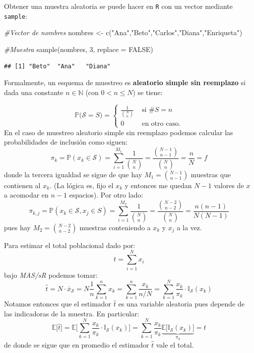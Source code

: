 \documentclass[
]{book}
\newenvironment{Shaded}{\begin{snugshade}}{\end{snugshade}}
\newcommand{\AttributeTok}[1]{\textcolor[rgb]{0.77,0.63,0.00}{#1}}
\newcommand{\CommentTok}[1]{\textcolor[rgb]{0.56,0.35,0.01}{\textit{#1}}}
\newcommand{\ConstantTok}[1]{\textcolor[rgb]{0.00,0.00,0.00}{#1}}
\newcommand{\DecValTok}[1]{\textcolor[rgb]{0.00,0.00,0.81}{#1}}
\newcommand{\FunctionTok}[1]{\textcolor[rgb]{0.00,0.00,0.00}{#1}}
\newcommand{\NormalTok}[1]{#1}
\newcommand{\OtherTok}[1]{\textcolor[rgb]{0.56,0.35,0.01}{#1}}
\newcommand{\StringTok}[1]{\textcolor[rgb]{0.31,0.60,0.02}{#1}}
\begin{document}
Obtener una muestra aleatoria se puede hacer en \texttt{R} con un vector mediante \texttt{sample}:

\begin{Shaded}
\begin{Highlighting}[]
\CommentTok{\#Vector de nombres}
\NormalTok{nombres }\OtherTok{\textless{}{-}} \FunctionTok{c}\NormalTok{(}\StringTok{"Ana"}\NormalTok{,}\StringTok{"Beto"}\NormalTok{,}\StringTok{"Carlos"}\NormalTok{,}\StringTok{"Diana"}\NormalTok{,}\StringTok{"Enriqueta"}\NormalTok{)}

\CommentTok{\#Muestra}
\FunctionTok{sample}\NormalTok{(nombres, }\DecValTok{3}\NormalTok{, }\AttributeTok{replace =} \ConstantTok{FALSE}\NormalTok{)}
\end{Highlighting}
\end{Shaded}

\begin{verbatim}
## [1] "Beto"  "Ana"   "Diana"
\end{verbatim}

Formalmente, un esquema de muestreo es \textbf{aleatorio simple sin reemplazo} si dada una constante \(n \in \mathbb{N}\) (con \(0 < n \leq N\)) se tiene:

\[
\mathbb{P}\big( \mathcal{S} = S \big) = \begin{cases}
\frac{1}{\binom{N}{n}} & \text{ si } \#S = n \\
0 & \text{ en otro caso.}
\end{cases}
\]
En el caso de muestreo aleatorio simple sin reemplazo podemos calcular las probabilidades de inclusión como siguen:
\[
\pi_k = \mathbb{P}(x_k \in \mathcal{S}) = \sum\limits_{i=1}^{M_1} \frac{1}{\binom{N}{n}} = \frac{\binom{N-1}{n-1}}{\binom{N}{n}} = \frac{n}{N} = f
\]
donde la tercera igualdad se sigue de que hay \(M_1 = \binom{N-1}{n-1}\) muestras que contienen al \(x_k\). (La lógica es, fijo el \(x_k\) y entonces me quedan \(N-1\) valores de \(x\) a acomodar en \(n-1\) espacios). Por otro lado:
\[
\pi_{k,j} = \mathbb{P}(x_k \in \mathcal{S}, x_j \in S) = \sum\limits_{i=1}^{M_2}  \frac{1}{\binom{N}{n}} = \frac{\binom{N-2}{n-2}}{\binom{N}{n}} = \dfrac{n(n-1)}{N(N-1)}
\]
pues hay \(M_2 = \binom{N-2}{n-2}\) muestras conteniendo a \(x_k\) y \(x_j\) a la vez.

Para estimar el total poblacional dado por:
\[
t = \sum\limits_{i=1}^N x_i
\]
bajo \emph{MAS/sR} podemos tomar:
\[
\hat{t} = N \cdot \bar{x}_{\mathcal{S}} = N \frac{1}{n} \sum\limits_{k = 1}^n x_k=  \sum\limits_{k = 1}^n \dfrac{x_k}{n/N} =  
\sum\limits_{k=1}^N \frac{x_k}{\pi_k} \cdot \mathbb{I}_{\mathcal{S}}(x_k)
\]
Notamos entonces que el estimador \(\hat{t}\) es una variable aleatoria pues depende de las indicadoras de la muestra. En particular:
\[
\mathbb{E}\big[ \hat{t} \big] = \mathbb{E}\bigg[\sum\limits_{k=1}^N \frac{x_k}{\pi_k} \cdot \mathbb{I}_{\mathcal{S}}(x_k) \bigg] = \sum\limits_{k=1}^N \frac{x_k}{\pi_k} \underbrace{\mathbb{E}\bigg[\mathbb{I}_{\mathcal{S}}(x_k) \bigg]}_{\pi_k}  = t
\]
de donde se sigue que en promedio el estimador \(\hat{t}\) vale el total.
\end{document}
